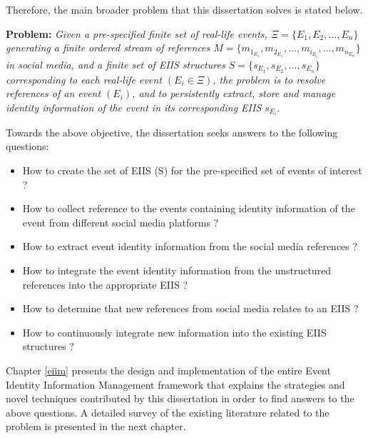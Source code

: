 Therefore, the main broader problem that this dissertation solves is stated below.


\textbf{Problem:} \textit{Given a pre-specified finite set of real-life events, $\Xi = \{E_{1},E_{2}, ... ,E_{n}\}$ generating a finite ordered stream of references $M = \{m_{1_{E_{1}}}, m_{2_{E_{1}}}, ... ,m_{i_{E_{i}}}, ... ,m_{n_{E_{n}}}\}$ in social media, and a finite set of EIIS structures $S = \{s_{E_{1}},s_{E_{2}}, ... ,s_{E_{n}}\}$ corresponding to each real-life event $(E_{i} \in \Xi)$, the problem is to resolve references of an event $(E_{i})$, and to persistently extract, store and manage identity information of the event in its corresponding EIIS $s_{E_{i}}$}.

Towards the above objective, the dissertation seeks answers to the following questions:

\begin{itemize}
\item How to create the set of  EIIS (S) for the pre-specified set of events of interest ?
\item How to collect reference to the events containing identity information of the event from different social media platforms ?
\item How to extract event identity information from the social media references ?
\item How to integrate the event identity information from the unstructured references into the appropriate EIIS ? 
\item How to determine that new references from social media relates to an EIIS ?
\item How to continuously integrate new information into the existing EIIS structures ?


\end{itemize}

Chapter \ref{eiim} presents the design and implementation of the entire Event Identity Information Management framework that explains the strategies and novel techniques contributed by this dissertation in order to find answers to the above questions. A detailed survey of the existing literature related to the problem is presented in the next chapter.



